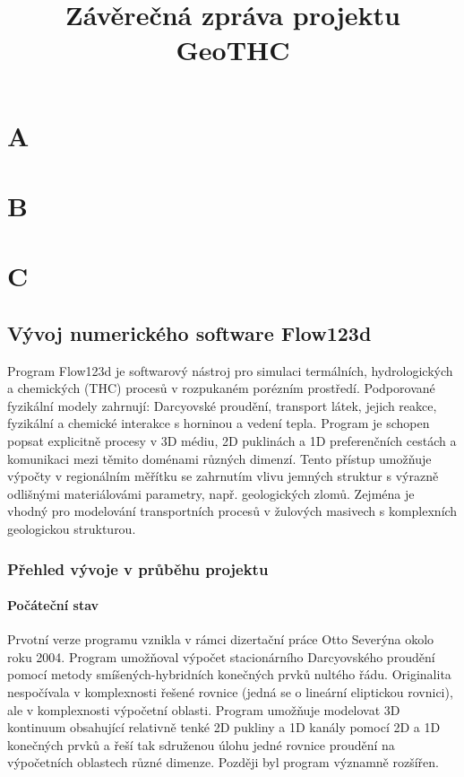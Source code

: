\documentclass[11pt]{report}
\begin{document}

\title{Závěrečná zpráva projektu GeoTHC}
\maketitle
\chapter{A}
\chapter{B}
\chapter{C}

\pagebreak
\setcounter{page}{10}
\section{Vývoj numerického software Flow123d}
Program Flow123d je softwarový nástroj pro simulaci termálních, hydrologických 
a chemických (THC) procesů v rozpukaném porézním prostředí. Podporované 
fyzikální modely zahrnují: Darcyovské proudění, transport látek, jejich reakce, 
fyzikální a chemické interakce s horninou a vedení tepla. Program je schopen 
popsat explicitně procesy v 3D médiu, 2D puklinách a 1D preferenčních cestách a 
komunikaci mezi těmito doménami různých dimenzí. Tento přístup umožňuje výpočty 
v regionálním měřítku se zahrnutím vlivu jemných struktur s výrazně odlišnými 
materiálovámi parametry, např. geologických zlomů. Zejména je vhodný pro  
modelování transportních procesů v žulových masivech s komplexních geologickou 
strukturou.  

\subsection{Přehled vývoje v průběhu projektu}

\subsubsection{Počáteční stav}
Prvotní verze programu vznikla v rámci dizertační práce 
Otto Severýna okolo roku 2004. Program umožňoval výpočet stacionárního 
Darcyovského proudění pomocí metody smíšených-hybridních ko\-neč\-ných prvků 
nultého řádu. Originalita nespočívala v komplexnosti řešené rovnice (jedná se o 
lineární eliptickou rovnici), ale v komplexnosti výpočetní oblasti. Program 
umožňuje modelovat 3D kontinuum obsahující relativně tenké 2D pukliny a 1D 
kanály pomocí 2D a 1D konečných prvků a řeší tak sdruženou úlohu jedné rovnice 
proudění na výpočetních oblastech různé dimenze. Později byl program významně 
rozšířen.
\end{document}
